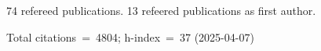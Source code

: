 74 refereed publications. 13 refeered publications as first author.

Total citations~=~4804; h-index~=~37 (2025-04-07)